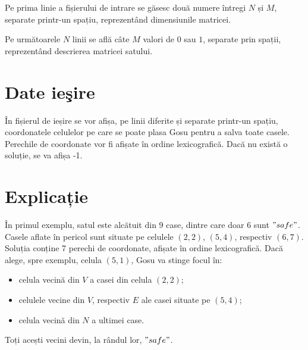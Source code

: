 \documentclass[ro]{problem}
\begin{document}
Pe prima linie a fișierului de intrare se găsesc două numere întregi $N$ și $M$, separate printr-un spațiu, reprezentând dimensiunile matricei.

Pe următoarele $N$ linii se află câte $M$ valori de $0$ sau $1$, separate prin spații, reprezentând descrierea matricei satului.

\section{Date ieşire}

În fișierul de ieșire se vor afișa, pe linii diferite și separate printr-un spațiu, coordonatele celulelor pe care se poate plasa Gosu pentru a salva toate casele. Perechile de coordonate vor fi afișate în ordine lexicografică. Dacă nu există o soluție, se va afișa -1. 

\begin{restrictions}

\end{restrictions}

\begin{examples}
%
%
\end{examples}

\section{Explicație}

În primul exemplu, satul este alcătuit din $9$ case, dintre care doar $6$ sunt $"safe"$. Casele aflate în pericol sunt situate pe celulele $(2, 2)$, $(5, 4)$, respectiv $(6, 7)$. Soluția conține 7 perechi de coordonate, afișate în ordine lexicografică. Dacă alege, spre exemplu, celula $(5, 1)$, Gosu va stinge focul în: 
\begin{itemize}
    \item celula vecină din $V$ a casei din celula $(2, 2)$;
    \item celulele vecine din $V$, respectiv $E$ ale casei situate pe $(5, 4)$;
    \item celula vecină din $N$ a ultimei case.
\end{itemize}
Toți acești vecini devin, la rândul lor, $"safe"$.
\end{document}
